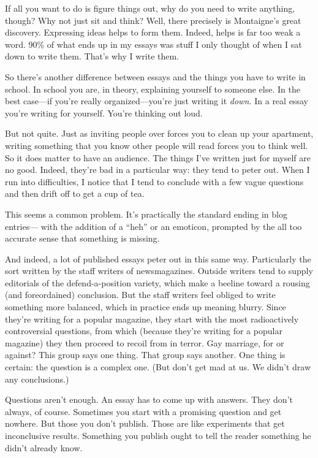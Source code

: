 \documentclass[12pt]{book}
\begin{document}
If all you want to do is figure things out, why do you need to write
anything, though? Why not just sit and think? Well, there precisely is
Montaigne's great discovery. Expressing ideas helps to form them.
Indeed, helps is far too weak a word. 90\% of what ends up in my essays
was stuff I only thought of when I sat down to write them. That's why I
write them.

So there's another difference between essays and the things you have to
write in school. In school you are, in theory, explaining yourself to
someone else. In the best case---if you're really organized---you're
just writing it \emph{down.} In a real essay you're writing for
yourself. You're thinking out loud.

But not quite. Just as inviting people over forces you to clean up your
apartment, writing something that you know other people will read forces
you to think well. So it does matter to have an audience. The things
I've written just for myself are no good. Indeed, they're bad in a
particular way: they tend to peter out. When I run into difficulties, I
notice that I tend to conclude with a few vague questions and then drift
off to get a cup of tea.

This seems a common problem. It's practically the standard ending in
blog entries--- with the addition of a ``heh'' or an emoticon, prompted
by the all too accurate sense that something is missing.

And indeed, a lot of published essays peter out in this same way.
Particularly the sort written by the staff writers of newsmagazines.
Outside writers tend to supply editorials of the defend-a-position
variety, which make a beeline toward a rousing (and foreordained)
conclusion. But the staff writers feel obliged to write something more
balanced, which in practice ends up meaning blurry. Since they're
writing for a popular magazine, they start with the most radioactively
controversial questions, from which (because they're writing for a
popular magazine) they then proceed to recoil from in terror. Gay
marriage, for or against? This group says one thing. That group says
another. One thing is certain: the question is a complex one. (But don't
get mad at us. We didn't draw any conclusions.)

Questions aren't enough. An essay has to come up with answers. They
don't always, of course. Sometimes you start with a promising question
and get nowhere. But those you don't publish. Those are like experiments
that get inconclusive results. Something you publish ought to tell the
reader something he didn't already know.
\end{document}
